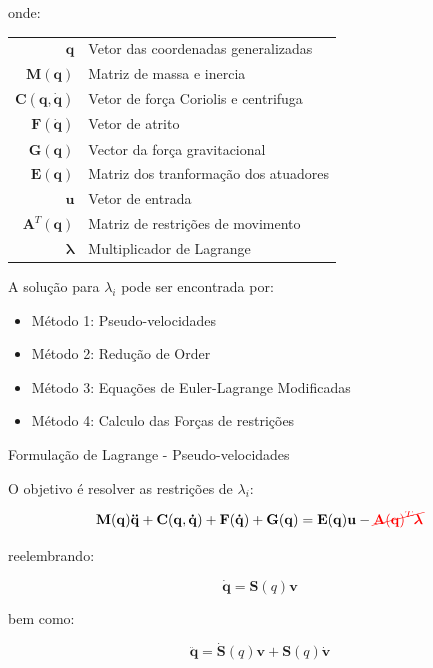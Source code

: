 onde:
\begin{tabular}{ r | l }
    $\mathbf{q}$               & Vetor das coordenadas generalizadas   \\
    $\mathbf{M(q)}$            & Matriz de massa e inercia             \\
    $\mathbf{C(q, \dot{q})}$   & Vetor de força Coriolis e centrifuga  \\
    $\mathbf{F(\dot{q})}$      & Vetor de atrito                       \\
    $\mathbf{G(q)}$            & Vector da força gravitacional         \\
    $\mathbf{E(q)}$            & Matriz dos tranformação dos atuadores \\
    $\mathbf{u}$               & Vetor de entrada                      \\
    $\mathbf{A}^T\mathbf{(q)}$ & Matriz de restrições de movimento     \\
    $\boldsymbol{\lambda}$     & Multiplicador de Lagrange             \\
\end{tabular}


A solução para $\lambda_i$ pode ser encontrada por:
\begin{itemize}
    \item Método 1: Pseudo-velocidades
    \item Método 2: Redução de Order 
    \item Método 3: Equações de Euler-Lagrange Modificadas 
    \item Método 4: Calculo das Forças de restrições 
\end{itemize}


Formulação de Lagrange - Pseudo-velocidades

O objetivo é resolver as restrições de $\lambda_i$:

\begin{equation}\label{eq:rmrestri}
    \mathbf{M(q)\ddot{q}+ C(q, \dot{q})+ F(\dot{q})+G(q) = E(q)u} - \textcolor{red}{\cancel{\mathbf{A}\mathbf{(q)}^T\boldsymbol{\lambda}}}
\end{equation}

reelembrando:

\begin{equation*}
    \mathbf{\dot{q}} = \mathbf{S}(q)\mathbf{v}
\end{equation*}

bem como:

\begin{equation}\label{eq:aprox_accel}
    \mathbf{\ddot{q}} = \mathbf{\dot{S}}(q)\mathbf{v} + \mathbf{S}(q)\mathbf{\dot{v}}
\end{equation}

